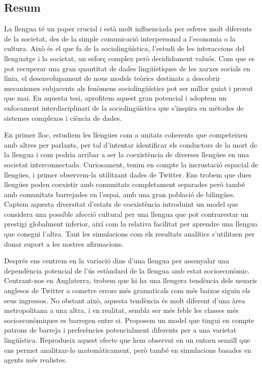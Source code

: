 \documentclass[../thesis.tex]{subfiles}
\begin{document}
\begin{otherlanguage}{catalan}
\chapter*{Resum}
La llengua té un paper crucial i està molt influenciada per esferes molt diferents de la
societat, des de la simple comunicació interpersonal a l'economia o la cultura. Això és
el que fa de la sociolingüística, l'estudi de les interaccions del llenguatge i la
societat, un esforç complex però decididament valuós. Com que es pot recuperar una gran
quantitat de dades lingüístiques de les xarxes socials en línia, el desenvolupament de
nous models teòrics destinats a descobrir mecanismes subjacents als fenòmens
sociolingüístics pot ser millor guiat i provat que mai. En aquesta tesi, aprofitem
aquest gran potencial i adoptem un enfocament interdisciplinari de la sociolingüística
que s'inspira en mètodes de sistemes complexos i ciència de dades.

En primer lloc, estudiem les llengües com a unitats coherents que competeixen amb altres
per parlants, per tal d'intentar identificar els conductors de la mort de la llengua i
com podria arribar a ser la coexistència de diverses llengües en una societat
interconnectada. Curiosament, tenim en compte la incrustació espacial de llengües, i
primer observem-la utilitzant dades de Twitter. Ens trobem que dues llengües poden
coexistir amb comunitats completament separades però també amb comunitats barrejades en
l'espai, amb una gran població de bilingües. Captem aquesta diversitat d'estats de
coexistència introduint un model que considera una possible afecció cultural per una
llengua que pot contrarestar un prestigi globalment inferior, així com la relativa
facilitat per aprendre una llengua que conegui l'altra. Tant les simulacions com els
resultats analítics s'utilitzen per donar suport a les nostres afirmacions.

Després ens centrem en la variació dins d'una llengua per assenyalar una dependència
potencial de l'ús estàndard de la llengua amb estat socioeconòmic. Centrant-nos en
Anglaterra, trobem que hi ha una lleugera tendència dels usuaris anglesos de Twitter a
cometre errors més gramaticals com més baixos siguin els seus ingressos. No obstant
això, aquesta tendència és molt diferent d'una àrea metropolitana a una altra, i en
realitat, sembla ser més feble les classes més socioeconòmiques es barregen entre si.
Proposem un model que tingui en compte patrons de barreja i preferències potencialment
diferents per a una varietat lingüística. Reprodueix aquest efecte que hem observat en
un entorn senzill que ens permet analitzar-lo matemàticament, però també en simulacions
basades en agents més realistes.


\end{otherlanguage}
\end{document}
